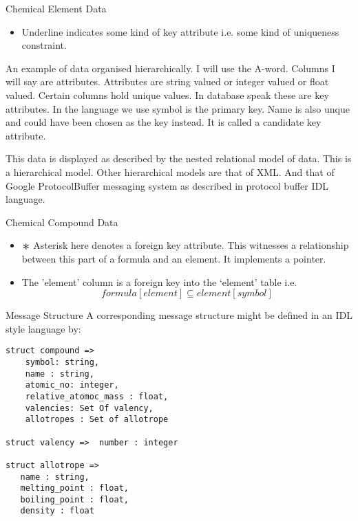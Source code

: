 

\begin{frame}{Chemical Element Data}
\scalebox{0.75}{

}

\begin{itemize}
	\item Underline indicates some kind of key attribute i.e. some kind of uniqueness constraint.
\end{itemize}
An example of data organised hierarchically. 
I will use the A-word. Columns I will say are attributes. Attributes are string valued or integer valued or float  valued.
Certain columns hold unique values. In database speak these are key attributes. In the language we use
symbol is the primary key. Name is also unque and could have been chosen as the key instead. It is called a candidate key attribute.


This data is displayed as described by the nested relational model of data. This is a hierarchical model.
Other hierarchical models are that of XML. And that of Google ProtocolBuffer messaging system as described in protocol buffer IDL language.
\end{frame}

\begin{frame}{Chemical Compound Data}
\scalebox{0.75}{

}
\begin{itemize}
\item $\largeAsterisk$ Asterisk here denotes a foreign key attribute. 
\pause This witnesses a relationship between this part of a formula and an element. \pause It implements a pointer.
	\item The 'element' column is a foreign key into the `element' table i.e.
	\begin{equation}
	              formula[element] \subseteq element[symbol]
	\end{equation}
\end{itemize}	
\end{frame}

\begin{frame}[fragile]{Message Structure}
A corresponding message structure might be defined 
in an IDL style language by:

\begin{lstlisting}[basicstyle=\footnotesize,language=IDL]
struct compound => 
    symbol: string,
    name : string,
    atomic_no: integer,
    relative_atomoc_mass : float,
    valencies: Set Of valency,
    allotropes : Set of allotrope

struct valency =>  number : integer 

struct allotrope =>
   name : string,
   melting_point : float,
   boiling_point : float,
   density : float
\end{lstlisting}
\end{frame}




